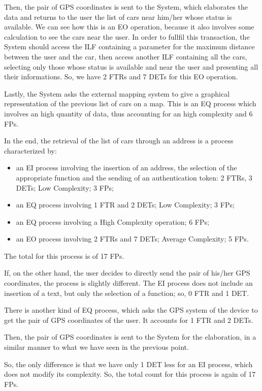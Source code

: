 Then, the pair of GPS coordinates is sent to the System, which elaborates the data and returns to the user the list of cars near him/her whose status is available. We can see how this is an EO operation, because it also involves some calculation to see the cars near the user. In order to fullfil this transaction, the System should access the ILF containing a parameter for the maximum distance between the user and the car, then access another ILF containing all the cars, selecting only those whose status is available and near the user and presenting all their informations. So, we have 2 FTRs and 7 DETs for this EO operation.

Lastly, the System asks the external mapping system to give a graphical representation of the previous list of cars on a map. This is an EQ process which involves an high quantity of data, thus accounting for an high complexity and 6 FPs.

In the end, the retrieval of the list of cars through an address is a process characterized by:
\begin{itemize}
	\item an EI process involving the insertion of an address, the selection of the appropriate function and the sending of an authentication token: 2 FTRs, 3 DETs; Low Complexity; 3 FPs;
	\item an EQ process involving 1 FTR and 2 DETs; Low Complexity; 3 FPs;
	\item an EQ process involving a High Complexity operation; 6 FPs;
	\item an EO process involving 2 FTRs and 7 DETs; Average Complexity; 5 FPs.
\end{itemize}
The total for this process is of 17 FPs.
\bigskip

If, on the other hand, the user decides to directly send the pair of his/her GPS coordinates, the process is slightly different.
The EI process does not include an insertion of a text, but only the selection of a function; so, 0 FTR and 1 DET.

There is another kind of EQ process, which asks the GPS system of the device to get the pair of GPS coordinates of the user. It accounts for 1 FTR and 2 DETs.

Then, the pair of GPS coordinates is sent to the System for the elaboration, in a similar manner to what we have seen in the previous point.

So, the only difference is that we have only 1 DET less for an EI process, which does not modify its complexity. So, the total count for this process is again of 17 FPs.
\bigskip

